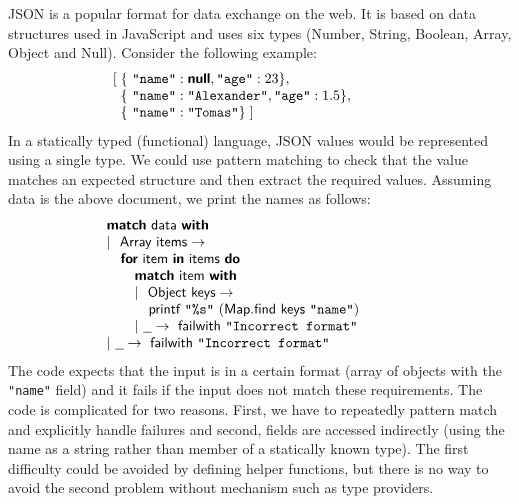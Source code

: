 \documentclass[10pt]{sigplanconf}
\newcommand{\kvd}[1]{\textbf{\sffamily #1}}
\newcommand{\ident}[1]{\textnormal{\sffamily #1}}
\newcommand{\str}[1]{\texttt{#1}}
\begin{document}
JSON is a popular format for data exchange on the web. It is based on data structures used in
JavaScript and uses six types (Number, String, Boolean, Array, Object and Null). Consider the
following example:
%
\begin{equation*}
\begin{array}{l}
[\; \{~\str{"name"}: \kvd{null}, \str{"age"}: 23 \}, \\
\;\;  \{~\str{"name"}: \str{"Alexander"}, \str{"age"}: 1.5 \}, \hspace{4em} \\
\;\;  \{~\str{"name"}: \str{"Tomas"} \} \; ]
\end{array}
\end{equation*}
%
In a statically typed (functional) language, JSON values would be represented using a single type. 
We could use pattern matching to check that the value matches an expected structure
and then extract the required values. Assuming \ident{data} is the above document, we print the 
names as follows:
%
\begin{equation*}
\begin{array}{l}
\kvd{match}~\ident{data}~\kvd{with}\\
|~\ident{Array items}\rightarrow\\
\quad\kvd{for}~\ident{item}~\kvd{in}~\ident{items}~\kvd{do}\\
\quad\quad\kvd{match}~\ident{item}~\kvd{with}\\
\quad\quad|~\ident{Object keys}\rightarrow\\
\quad\quad\quad\ident{printf}~\str{"\%s"}~(\ident{Map.find keys}~\str{"name"})\\
\quad\quad|~\underline{~\;}\rightarrow \ident{failwith}~\str{"Incorrect format"} \hspace{4em}\\
|~\underline{~\;}\rightarrow \ident{failwith}~\str{"Incorrect format"}
\end{array}
\end{equation*}
%
The code expects that the input is in a certain format (array of objects with the \str{"name"} field)
and it fails if the input does not match these requirements. The code is complicated for two reasons.
First, we have to repeatedly pattern match and explicitly handle failures and second, fields are
accessed indirectly (using the name as a string rather than member of a statically known type).
The first difficulty could be avoided by defining helper functions, but there is no way to avoid the 
second problem without mechanism such as type providers.
\end{document}
